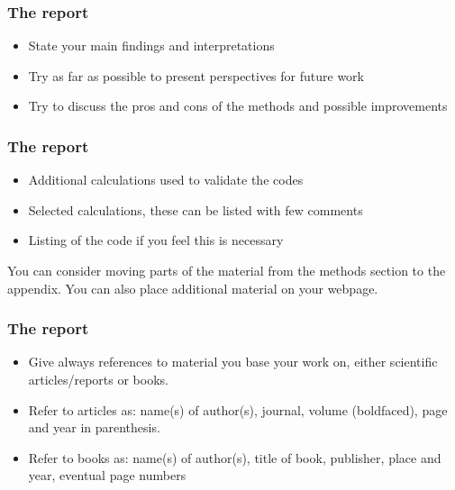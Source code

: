 \documentclass[handout]{beamer}
\newenvironment{block_mdfboxadmon}[1][]{\begin{block}{#1}}{\end{block}}
\begin{document}
\begin{frame}
\frametitle{The report}

\begin{block_mdfboxadmon}
\begin{itemize}
 \item State your main findings and interpretations

 \item Try as far as possible to present perspectives for future work

 \item Try to discuss the pros and cons of the methods and possible improvements
\end{itemize}

\noindent
\end{block_mdfboxadmon}
\end{frame}

\begin{frame}
\frametitle{The report}

\begin{block_mdfboxadmon}
\begin{itemize}
 \item Additional calculations used to validate the codes

 \item Selected calculations, these can be listed with  few comments

 \item Listing of the code if you feel this is necessary
\end{itemize}

\noindent
You can consider moving parts of the material from the methods section to the appendix. You can also place additional material on your webpage.
\end{block_mdfboxadmon}
\end{frame}

\begin{frame}
\frametitle{The report}

\begin{block_mdfboxadmon}
\begin{itemize}
 \item Give always references to material you base your work on, either  scientific articles/reports or books.

 \item Refer to articles as: name(s) of author(s), journal, volume (boldfaced), page and year in parenthesis.

 \item Refer to books as: name(s) of author(s), title of book, publisher, place and year, eventual page numbers
\end{itemize}

\noindent
\end{block_mdfboxadmon}
\end{frame}
\end{document}
